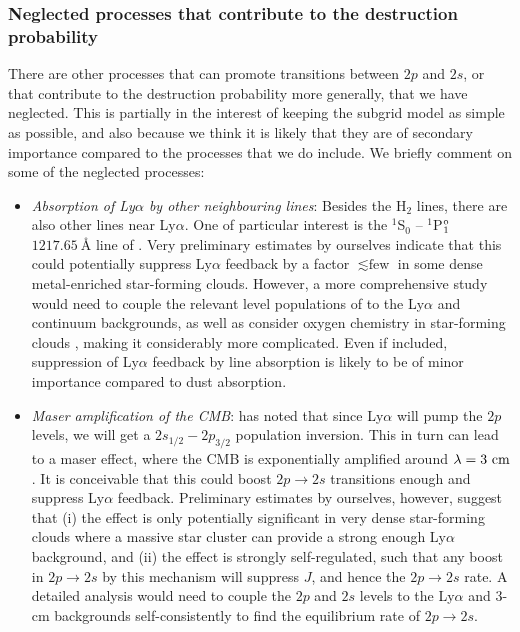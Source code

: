 \documentclass[fleqn,usenatbib]{mnras}
\newcommand\OI{\ion{O}{I}\xspace} %
\begin{document}
\subsubsection{Neglected processes that contribute to the destruction probability}
\label{neglected processes for pd}

There are other processes that can promote transitions between $2p$ and $2s$, or that contribute to the destruction probability more generally, that we have neglected. This is partially in the interest of keeping the subgrid model as simple as possible, and also because we think it is likely that they are of secondary importance compared to the processes that we do include. We briefly comment on some of the neglected processes:
\begin{itemize}
    \item \textit{Absorption of Ly$\alpha$ by other neighbouring lines}: Besides the H$_2$ lines, there are also other lines near Ly$\alpha$. One of particular interest is the $^1$S$_0$ -- $^1$P$_{1}^{\rm o}$ $1217.65 ~ \textrm{Å}$ line of \OI \citep{Forsman1973, NIST_ASD}. Very preliminary estimates by ourselves indicate that this could potentially suppress Ly$\alpha$ feedback by a factor $\lesssim \textrm{few}$ in some dense metal-enriched star-forming clouds. However, a more comprehensive study would need to couple the relevant level populations of \OI to the Ly$\alpha$ and continuum backgrounds, as well as consider oxygen chemistry in star-forming clouds \citep[e.g.][]{Omukai2005, Hollenbach2009}, making it considerably more complicated. Even if included, suppression of Ly$\alpha$ feedback by \OI line absorption is likely to be of minor importance compared to dust absorption. \\
    
    \item \textit{Maser amplification of the CMB}: \cite{Dijkstra2016} has noted that since Ly$\alpha$ will pump the $2p$ levels, we will get a $2s_{1/2}-2p_{3/2}$ population inversion. This in turn can lead to a maser effect, where the CMB is exponentially amplified around $\lambda = 3 ~ \rm cm$. It is conceivable that this could boost $2p \rightarrow 2s$ transitions enough and suppress Ly$\alpha$ feedback. Preliminary estimates by ourselves, however, suggest that (i) the effect is only potentially significant in very dense star-forming clouds where a massive star cluster can provide a strong enough Ly$\alpha$ background, and (ii) the effect is strongly self-regulated, such that any boost in $2p \rightarrow 2s$ by this mechanism will suppress $J$, and hence the  $2p \rightarrow 2s$ rate. A detailed analysis would need to couple the $2p$ and $2s$ levels to the Ly$\alpha$ and 3-cm backgrounds self-consistently to find the equilibrium rate of $2p \rightarrow 2s$. \\


\end{itemize}
\end{document}
